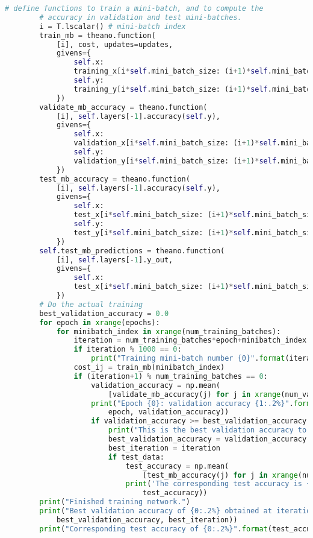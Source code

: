 \begin{fullwidth}
\begin{lstlisting}[caption={network3.py (Python 2.7)},label={lst:network3.py}, language=Python]
        # define functions to train a mini-batch, and to compute the
        # accuracy in validation and test mini-batches.
        i = T.lscalar() # mini-batch index
        train_mb = theano.function(
            [i], cost, updates=updates,
            givens={
                self.x:
                training_x[i*self.mini_batch_size: (i+1)*self.mini_batch_size],
                self.y:
                training_y[i*self.mini_batch_size: (i+1)*self.mini_batch_size]
            })
        validate_mb_accuracy = theano.function(
            [i], self.layers[-1].accuracy(self.y),
            givens={
                self.x:
                validation_x[i*self.mini_batch_size: (i+1)*self.mini_batch_size],
                self.y:
                validation_y[i*self.mini_batch_size: (i+1)*self.mini_batch_size]
            })
        test_mb_accuracy = theano.function(
            [i], self.layers[-1].accuracy(self.y),
            givens={
                self.x:
                test_x[i*self.mini_batch_size: (i+1)*self.mini_batch_size],
                self.y:
                test_y[i*self.mini_batch_size: (i+1)*self.mini_batch_size]
            })
        self.test_mb_predictions = theano.function(
            [i], self.layers[-1].y_out,
            givens={
                self.x:
                test_x[i*self.mini_batch_size: (i+1)*self.mini_batch_size]
            })
        # Do the actual training
        best_validation_accuracy = 0.0
        for epoch in xrange(epochs):
            for minibatch_index in xrange(num_training_batches):
                iteration = num_training_batches*epoch+minibatch_index
                if iteration % 1000 == 0:
                    print("Training mini-batch number {0}".format(iteration))
                cost_ij = train_mb(minibatch_index)
                if (iteration+1) % num_training_batches == 0:
                    validation_accuracy = np.mean(
                        [validate_mb_accuracy(j) for j in xrange(num_validation_batches)])
                    print("Epoch {0}: validation accuracy {1:.2%}".format(
                        epoch, validation_accuracy))
                    if validation_accuracy >= best_validation_accuracy:
                        print("This is the best validation accuracy to date.")
                        best_validation_accuracy = validation_accuracy
                        best_iteration = iteration
                        if test_data:
                            test_accuracy = np.mean(
                                [test_mb_accuracy(j) for j in xrange(num_test_batches)])
                            print('The corresponding test accuracy is {0:.2%}'.format(
                                test_accuracy))
        print("Finished training network.")
        print("Best validation accuracy of {0:.2%} obtained at iteration {1}".format(
            best_validation_accuracy, best_iteration))
        print("Corresponding test accuracy of {0:.2%}".format(test_accuracy))


\end{lstlisting}
\end{fullwidth}
